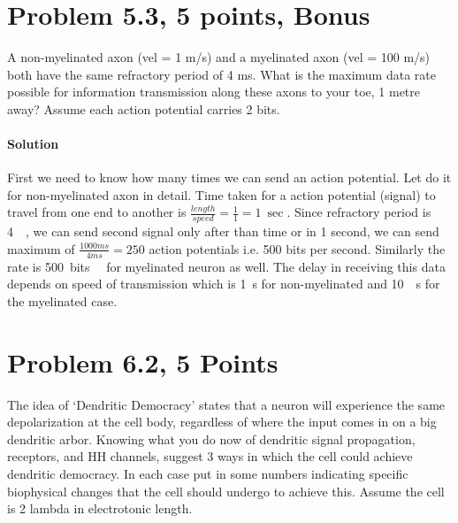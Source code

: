 \documentclass[a4paper,10pt]{article}
\begin{document}
\section*{Problem 5.3, 5 points, Bonus}
A non-myelinated axon (vel = 1 m/s) and a myelinated axon (vel = 100 m/s) both
have the same refractory period of 4 ms. What is the maximum data rate possible
for information transmission along these axons to your toe, 1 metre away? Assume
each action potential carries 2 bits.
    
\paragraph{Solution}

First we need to know how many times we can send an action potential. Let do it
for non-myelinated axon in detail. Time taken for a action potential (signal) to
travel from one end to another is 
$\frac{length}{speed} = \frac{1}{1} = \SI{1}{\sec}$. Since refractory period is
\SI{4}{\milli \sec}, we can send second signal only after than time or in 1
second, we can send maximum of $\frac{1000 ms}{4 ms} = 250$ action potentials
i.e. 500 bits per second. Similarly the rate is \SI{500}{bits \per \sec} for
myelinated neuron as well. The delay in receiving this data depends on speed of
transmission which is \SI{1}{\second} for non-myelinated and \SI{10}{\milli
\second} for the myelinated case.

\section*{Problem 6.2, 5 Points}

The idea of ‘Dendritic Democracy’ states that a neuron will experience the same
depolarization at the cell body, regardless of where the input comes in on a big
dendritic arbor. Knowing what you do now of dendritic signal propagation,
receptors, and HH channels, suggest 3 ways in which the cell could achieve
dendritic democracy. In each case put in some numbers indicating specific
biophysical changes that the cell should undergo to achieve this. Assume the
cell is 2 lambda in electrotonic length.

%
%
\end{document}
